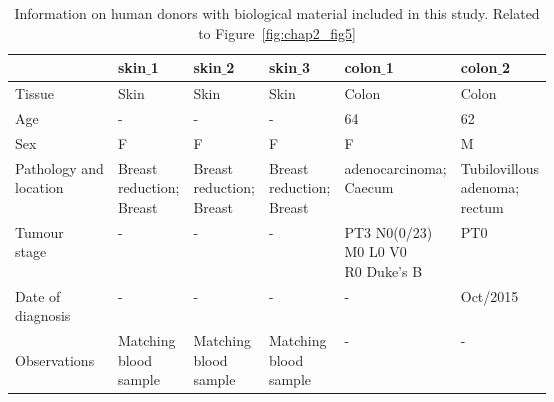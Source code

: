 \begin{table}[H]
\footnotesize
\caption[Clinical information on human donors included in this study]{Information on human donors with biological material included in this study. Related to Figure~\ref{fig:chap2_fig5}}
\centering
\label{table:tab_A_2}
\begin{tabular}{l|l l l l l}
\hline 
  & skin${\_}$1 & skin${\_}$2 & skin${\_}$3 & colon${\_}$1 & colon${\_}$2\\
\hline
Tissue & Skin & Skin & Skin & Colon & Colon\\

Age & - & - & - & 64 & 62\\

Sex & F & F & F & F & M\\

\specialcell[t]{Pathology and\\location} & \specialcell[t]{Breast\\reduction;\\Breast} & \specialcell[t]{Breast\\reduction;\\Breast} & \specialcell[t]{Breast\\reduction;\\Breast} & \specialcell[t]{adenocarcinoma;\\Caecum} & \specialcell[t]{Tubilovillous\\adenoma;\\rectum}\\

\specialcell[t]{Tumour\\stage} & - & - & - & \specialcell[t]{PT3 N0(0/23)\\M0 L0 V0\\R0 Duke's B} & PT0\\

\specialcell[t]{Date of\\diagnosis} & - & - & - & - & Oct/2015\\

\specialcell[t]{ \\Observations\\ } & \specialcell[t]{Matching\\blood\\sample} & \specialcell[t]{Matching\\blood\\sample} & \specialcell[t]{Matching\\blood\\sample} & - & -\\
\hline 
\end{tabular}
\end{table}

